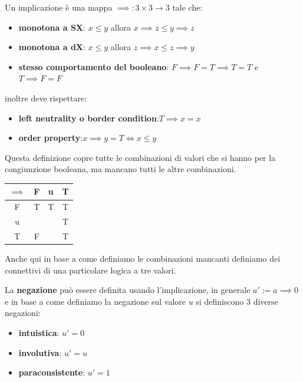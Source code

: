 \begin{definizione}
    Un implicazione è una mappa $\implies: 3\times 3 \to 3$ tale che:
    \begin{itemize}
        \item \textbf{monotona a SX}: $x\le y$ allora $x\implies z\le y\implies z$ 
        \item \textbf{monotona a dX}: $x\le y$ allora $z\implies x\le z\implies y$ 
        \item \textbf{stesso comportamento del booleano}: $F\implies F=T\implies T = T$ e $T\implies F = F$
    \end{itemize}
    inoltre deve rispettare:
    \begin{itemize}
        \item \textbf{left neutrality o border condition}:$T\implies x = x$
        \item \textbf{order property}:$x\implies y = T\iff x\le y$
    \end{itemize}
\end{definizione}

Questa definizione copre tutte le combinazioni di valori che si hanno per la congiunzione 
booleana, ma mancano tutti le altre combinazioni.

\begin{table}[!h]
    \centering
    \begin{tabular}{c|c|c|c}
        $\implies$ & F & u & T \\
        \hline
        F        & T & T & T \\
        u        &  &  & T \\
        T        & F &  & T
    \end{tabular}
\end{table}

Anche qui in base a come definiamo le combinazioni mancanti definiamo dei connettivi 
di una particolare logica a tre valori.

La \textbf{negazione} può essere definita usando l'implicazione, in generale 
$a':= a\implies 0$  e in base a come definiamo la negazione sul valore $u$ 
si definiscono $3$ diverse negazioni:
\begin{itemize}
    \item \textbf{intuistica}: $u' = 0 $
    \item \textbf{involutiva}: $u' = u $
    \item \textbf{paraconsistente}: $u' = 1 $
\end{itemize}

